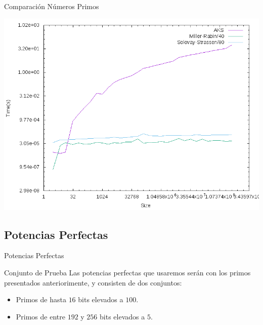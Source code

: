 \documentclass{beamer}
\begin{document}
\begin{frame}{Comparación Números Primos}
	\begin{alertblock}{}
		\begin{center}
			\includegraphics[scale=0.40]{../Memoria/img/graphs/aks-probs-primes-mean}
		\end{center}
	\end{alertblock}
\end{frame}

\subsection{Potencias Perfectas}

\begin{frame}
	\centering
	\begin{Large}
		Potencias Perfectas
	\end{Large}
\end{frame}

\begin{frame}{Conjunto de Prueba}
	Las potencias perfectas que usaremos serán con los primos presentados anteriorimente, y consisten de dos conjuntos:\break
	
	\begin{itemize}[<+(1)->]
		\item Primos de hasta $16$ bits elevados a $100$.
		
		\item Primos de entre $192$ y $256$ bits elevados a $5$.
	\end{itemize}
\end{frame}
\end{document}

